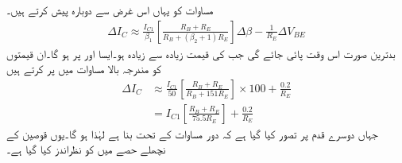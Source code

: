 مساوات  کو یہاں اس غرض سے دوبارہ پیش کرتے ہیں۔
\begin{align*}
\Delta I_C \approx \frac{I_{C1}}{\beta_1} \left [\frac{R_B+R_E}{R_B+\left (\beta_2+1 \right )R_E} \right ] \Delta \beta-\frac{1}{R_E} \Delta V_{BE}
\end{align*}
بدترین صورت اس وقت پائی جائے گی جب  کی قیمت زیادہ سے زیادہ ہو۔ایسا  اور  پر ہو گا۔ان قیمتوں کو مندرجہ بالا مساوات میں پر کرتے ہیں
\begin{align*}
\Delta I_C &\approx \frac{I_{C1}}{50} \left [\frac{R_B+R_E}{R_B+151 R_E} \right ] \times 100+\frac{0.2}{R_E}\\
&=I_{C1} \left [\frac{R_B+R_E}{75.5 R_E} \right ]+\frac{0.2}{R_E}
\end{align*}
جہاں دوسرے قدم پر تصور کیا گیا ہے کہ دور مساوات  کے تحت بنا ہے  لہٰذا  ہو گا۔یوں قوصین کے نچھلے حصے میں  کو نظراندز کیا گیا ہے۔



